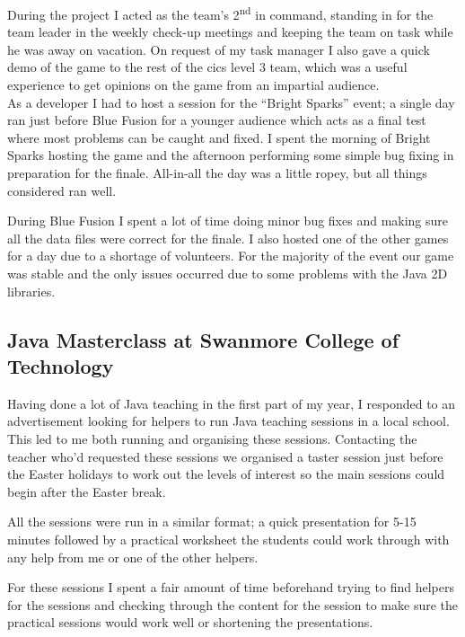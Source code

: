 \documentclass[a4paper,11pt]{report}
\begin{document}
During the project I acted as the team's 2\textsuperscript{nd} in command, standing in for the team
leader in the weekly check-up meetings and keeping the team on task while he was away on vacation.
On request of my task manager I also gave a quick demo of the game to the rest of the \gls{cics}
level 3 team, which was a useful experience to get opinions on the game from an impartial audience.
\\



As a developer I had to host a session for the ``Bright Sparks'' event; a single day ran just
before Blue Fusion for a younger audience which acts as a final test where most problems can be
caught and fixed. I spent the morning of Bright Sparks hosting the game and the afternoon 
performing some simple bug fixing in preparation for the finale. All-in-all the day was a little
ropey, but all things considered ran well.

During Blue Fusion I spent a lot of time doing minor bug fixes and making sure all the data files 
were correct for the finale. I also hosted one of the other games for a day due to a shortage of
volunteers. For the majority of the event our game was stable and the only issues occurred due to
some problems with the Java 2D libraries. \\



\subsection{Java Masterclass at Swanmore College of Technology}

Having done a lot of Java teaching in the first part of my year, I responded to an advertisement
looking for helpers to run Java teaching sessions in a local school. This led to me both running
and organising these sessions. Contacting the teacher who'd requested these sessions we organised
a taster session just before the Easter holidays to work out the levels of interest so the main
sessions could begin after the Easter break.

All the sessions were run in a similar format; a quick presentation for 5-15 minutes followed by a
practical worksheet the students could work through with any help from me or one of the other 
helpers.

For these sessions I spent a fair amount of time beforehand trying to find helpers for the sessions
and checking through the content for the session to make sure the practical sessions would work 
well or shortening the presentations. \\
\end{document}
